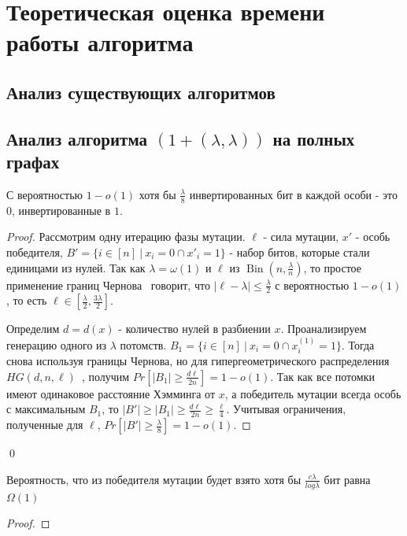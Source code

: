 \documentclass[times]{itmo-student-thesis}
\newcommand{\alglambda}{${(1 + (\lambda , \lambda))}$\xspace}
\DeclareMathOperator{\Bin}{Bin}
\begin{document}
\chapter{Теоретическая оценка времени работы алгоритма}

\section{Анализ существующих алгоритмов}

\section{Анализ алгоритма \alglambda на полных графах}

\begin{lemma}\label{lem:mut1}
С вероятностью $1- o(1)$ хотя бы $\frac{\lambda}{8}$ инвертированных бит в каждой особи - это $0$, инвертированные в $1$.
\end{lemma}

\begin{proof}
Рассмотрим одну итерацию фазы мутации. $\ell$ - сила мутации, $x'$ - особь победителя, $B' = \{i \in [n] ~|~ x_i = 0 \cap x'_i = 1\}$ - набор битов, которые стали единицами из нулей.
Так как $\lambda = \omega(1)$ и $\ell$ из $\Bin\left(n, \frac{\lambda}{n}\right)$, то простое применение границ Чернова~\cite{ссылка} говорит, что $|\ell - \lambda| \le \frac{\lambda}{2}$ с вероятностью $1- o(1)$, то есть $\ell \in [\frac{\lambda}{2}, \frac{3\lambda}{2}]$.

Определим $d = d(x)$ - количество нулей в разбиении $x$. Проанализируем генерацию одного из $\lambda$ потомств. $B_1 = \{i \in [n] ~|~ x_i = 0 \cap x^{(1)}_i = 1\}$. Тогда снова используя границы Чернова, но для гипергеометрического распределения $HG(d, n, \ell)$~\cite{ссылка}, получим $Pr[|B_1| \ge \frac{d\ell}{2n}] = 1 - o(1)$.
Так как все потомки имеют одинаковое расстояние Хэмминга от $x$, а победитель мутации всегда особь с максимальным $B_1$, то $|B'| \ge |B_1| \ge \frac{d\ell}{2n} \ge \frac{\ell}{4}$. Учитывая ограничения, полученные для $\ell$, $Pr[|B'| \ge \frac{\lambda}{8}] = 1 - o(1)$.
\end{proof}\qed

\begin{lemma}\label{lem:mut2}
Вероятность, что из победителя мутации будет взято хотя бы $\frac{c\lambda}{log\lambda}$ бит равна $\Omega(1)$
\end{lemma}

\begin{proof}

\end{proof}
\chapterconclusion
\end{document}

